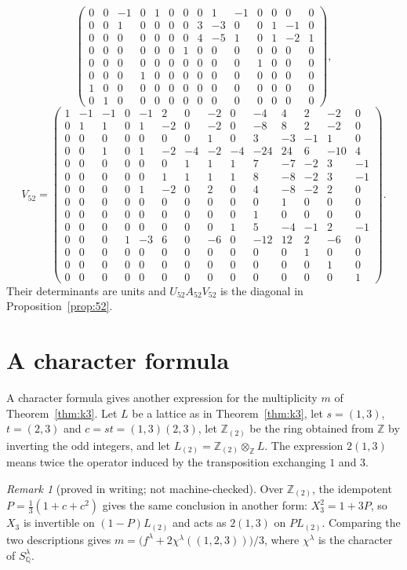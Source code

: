 \documentclass[11pt]{article}
\theoremstyle{remark}
\newtheorem{remark}[theorem]{Remark}
\newcommand{\Z}{\mathbb{Z}}
\newcommand{\Q}{\mathbb{Q}}
\begin{document}
\begin{appendices}
\[\begin{pmatrix}
0&0&-1&0&1&0&0&0&1&-1&0&0&0&0\\
0&0&1&0&0&0&0&3&-3&0&0&1&-1&0\\
0&0&0&0&0&0&0&4&-5&1&0&1&-2&1\\
0&0&0&0&0&0&1&0&0&0&0&0&0&0\\
0&0&0&0&0&0&0&0&0&0&1&0&0&0\\
0&0&0&1&0&0&0&0&0&0&0&0&0&0\\
1&0&0&0&0&0&0&0&0&0&0&0&0&0\\
0&1&0&0&0&0&0&0&0&0&0&0&0&0
\end{pmatrix},
\]
\[
V_{52}=\begin{pmatrix}
1&-1&-1&0&-1&2&0&-2&0&-4&4&2&-2&0\\
0&1&1&0&1&-2&0&-2&0&-8&8&2&-2&0\\
0&0&0&0&0&0&0&1&0&3&-3&-1&1&0\\
0&0&1&0&1&-2&-4&-2&-4&-24&24&6&-10&4\\
0&0&0&0&0&0&1&1&1&7&-7&-2&3&-1\\
0&0&0&0&0&1&1&1&1&8&-8&-2&3&-1\\
0&0&0&0&1&-2&0&2&0&4&-8&-2&2&0\\
0&0&0&0&0&0&0&0&0&0&1&0&0&0\\
0&0&0&0&0&0&0&0&0&1&0&0&0&0\\
0&0&0&0&0&0&0&0&1&5&-4&-1&2&-1\\
0&0&0&1&-3&6&0&-6&0&-12&12&2&-6&0\\
0&0&0&0&0&0&0&0&0&0&0&1&0&0\\
0&0&0&0&0&0&0&0&0&0&0&0&1&0\\
0&0&0&0&0&0&0&0&0&0&0&0&0&1
\end{pmatrix}.
\]
Their determinants are units and $U_{52}A_{52}V_{52}$ is the diagonal in
Proposition~\ref{prop:52}.
\section{A character formula}\label{app:character}
A character formula gives another expression for the multiplicity $m$ of
Theorem~\ref{thm:k3}. Let $L$ be a lattice as in Theorem~\ref{thm:k3}, let
$s=(1,3)$, $t=(2,3)$ and $c=st=(1,3)(2,3)$, let $\Z_{(2)}$ be the ring
obtained from $\Z$ by inverting the odd integers, and let
$L_{(2)}=\Z_{(2)}\otimes_\Z L$. The expression $2(1,3)$ means twice the
operator induced by the transposition exchanging $1$ and $3$.

\begin{remark}[proved in writing; not machine-checked]\label{rem:projector}
Over $\Z_{(2)}$, the idempotent $P=\frac13(1+c+c^2)$ gives the same
conclusion in another form: $X_3^2=1+3P$, so $X_3$ is invertible on
$(1-P)L_{(2)}$ and acts as $2(1,3)$ on $PL_{(2)}$. Comparing the two
descriptions gives $m=\bigl(f^\lambda+2\chi^\lambda((1,2,3))\bigr)/3$,
where $\chi^\lambda$ is the character of $S^\lambda_\Q$.
\end{remark}


\end{appendices}
\end{document}
